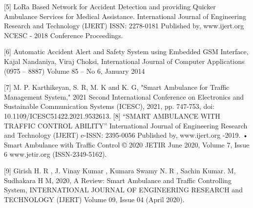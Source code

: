 \documentclass[conference]{IEEEtran}
\begin{document}
[5] LoRa Based Network for Accident Detection and providing Quicker Ambulance Services for Medical Assistance. International Journal of Engineering Research and Technology (IJERT) ISSN: 2278-0181 Published by, www.ijert.org NCESC - 2018 Conference Proceedings.

[6] Automatic Accident Alert and Safety System using Embedded GSM Interface, Kajal Nandaniya, Viraj Choksi, International Journal of Computer Applications (0975 – 8887) Volume 85 – No 6, January 2014 

[7] M. P. Karthikeyan, S. R, M. K and K. G, "Smart Ambulance for Traffic Management System," 2021 Second International Conference on Electronics and Sustainable Communication Systems (ICESC), 2021, pp. 747-753, doi: 10.1109/ICESC51422.2021.9532613. 
[8] “SMART AMBULANCE WITH TRAFFIC CONTROL ABILITY” International Journal of Engineering Research and Technology (IJERT) e-ISSN: 2395-0056 Published by, www.ijert.org -2019. • Smart Ambulance with Traffic Control © 2020 JETIR June 2020, Volume 7, Issue 6 www.jetir.org (ISSN-2349-5162). 

[9] Girish H. R , J. Vinay Kumar , Kumara Swamy N. R , Sachin Kumar. M, Sudhakara H M, 2020, A Review: Smart Ambulance and Traffic Controlling System, INTERNATIONAL JOURNAL OF ENGINEERING RESEARCH and TECHNOLOGY (IJERT) Volume 09, Issue 04 (April 2020).
\end{document}
